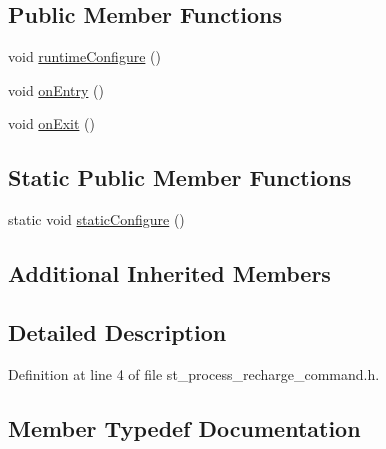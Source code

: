 \subsection*{Public Member Functions}
\begin{DoxyCompactItemize}
\item 
void \hyperlink{structsm__pr2__plugs_1_1StProcessRechargeCommand_ae401a2e897f446ddbde833e7686fcd7a}{runtime\+Configure} ()
\item 
void \hyperlink{structsm__pr2__plugs_1_1StProcessRechargeCommand_af8f1fc7f15100696558854bbcdc9d56e}{on\+Entry} ()
\item 
void \hyperlink{structsm__pr2__plugs_1_1StProcessRechargeCommand_a64113d9e373eb891ccab3785b586432e}{on\+Exit} ()
\end{DoxyCompactItemize}
\subsection*{Static Public Member Functions}
\begin{DoxyCompactItemize}
\item 
static void \hyperlink{structsm__pr2__plugs_1_1StProcessRechargeCommand_ad4c6ec976c76402dd0fe6002036d2462}{static\+Configure} ()
\end{DoxyCompactItemize}
\subsection*{Additional Inherited Members}


\subsection{Detailed Description}


Definition at line 4 of file st\+\_\+process\+\_\+recharge\+\_\+command.\+h.



\subsection{Member Typedef Documentation}
\mbox{\label{structsm__pr2__plugs_1_1StProcessRechargeCommand_a97c8363f0989dc9dabc36a20445ba569}} 

